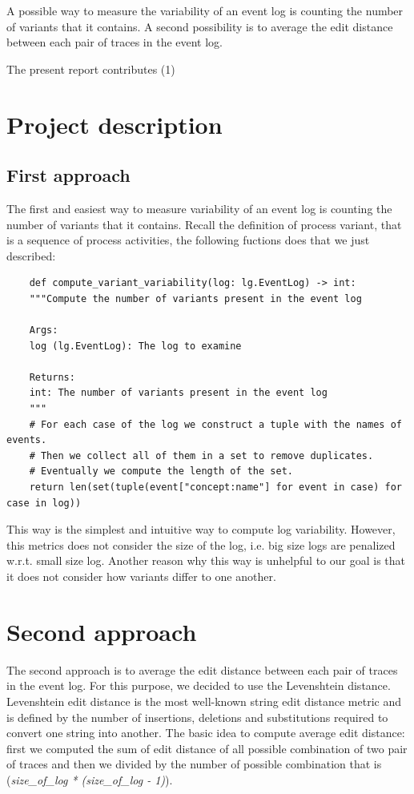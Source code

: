 \documentclass[12pt]{article}
\begin{document}
A possible way to measure the variability of an event log is counting the number of variants that it contains. A second possibility is to average the edit distance between each pair of traces in the event log. 

The present report contributes (1) 


\section*{Project description}

\subsection*{First approach}

The first and easiest way to measure variability of an event log is counting the number of variants that it contains. Recall the definition of process variant, that is a sequence of process activities, the following fuctions does that we just described:


\begin{verbatim}
	def compute_variant_variability(log: lg.EventLog) -> int:
	"""Compute the number of variants present in the event log
	
	Args:
	log (lg.EventLog): The log to examine
	
	Returns:
	int: The number of variants present in the event log
	"""
	# For each case of the log we construct a tuple with the names of events.
	# Then we collect all of them in a set to remove duplicates.
	# Eventually we compute the length of the set.
	return len(set(tuple(event["concept:name"] for event in case) for case in log))
\end{verbatim}


\noindent This way is the simplest and intuitive way to compute log variability. However, this metrics does not consider the size of the log, i.e. big size logs are penalized w.r.t. small size log. Another reason why this way is unhelpful to our goal is that it does not consider how variants differ to one another.


\section*{Second approach}

The second approach is to average the edit distance between each pair of traces in the event log. For this purpose, we decided to use the Levenshtein distance. Levenshtein edit distance is the most well-known string edit distance metric and is defined by the number of insertions, deletions and substitutions required to convert one string into another. The basic idea to compute average edit distance: first we computed the sum of edit distance of all possible combination of two pair of traces and then we divided by the number of possible combination that is (\textit{size\_of\_log * (size\_of\_log - 1)}).
\end{document}
